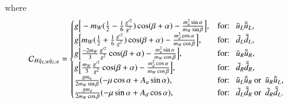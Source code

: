\documentclass[final,3p,times,pdflatex]{elsarticle}
\begin{document}
where
\begin{equation}
\mathcal{C}_{H \tilde{q}_{L/R} \tilde{q}_{L/R}} = \begin{cases}
			g\Big[-m_W ({1 \over 2} - {1 \over 6}{g'^2 \over g^2} )\cos(\beta+\alpha) - {m_{u}^2 \sin \alpha \over m_W \sin \beta}\Big], & $for: $\: \: \tilde{u}_L\bar{\tilde{u}}_L, \\
			g\Big[m_W ({1 \over 2} + {1 \over 6}{g'^2 \over g^2} )\cos(\beta+\alpha) - {m_{d}^2 \cos \alpha \over m_W \cos \beta}\Big], & $for: $\: \: \tilde{d}_L\bar{\tilde{d}}_L, \\
			g\Big[{-2m_W \over 3}{g'^2 \over g^2}\cos(\beta+\alpha) - {m_{u}^2 \sin \alpha \over m_W \cos \beta}\Big], & $for:  $\: \: \tilde{u}_R\bar{\tilde{u}}_R, \\
			g\Big[{m_W \over 3}{g'^2 \over g^2}\cos(\beta+\alpha) - {m_{d}^2 \cos \alpha \over m_W \cos \beta}\Big], & $for: $\: \: \tilde{d}_R\bar{\tilde{d}}_R, \\
			{g m_{u} \over 2 m_{W} \sin\beta}(-\mu \cos\alpha + A_{u}\sin\alpha), & $for: $\: \: \tilde{u}_L \bar{\tilde{u}}_R \: $or $\: \tilde{u}_R \bar{\tilde{u}}_L, \\
			{g m_{d} \over 2 m_{W} \cos\beta}(-\mu \sin\alpha + A_{d}\cos\alpha), & $for: $\: \: \tilde{d}_L \bar{\tilde{d}}_R \: $or $\: \tilde{d}_R \bar{\tilde{d}}_L. \\
			\end{cases}
\end{equation}
\end{document}
